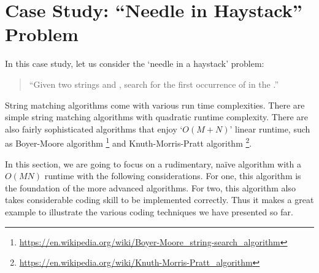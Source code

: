 %
%
%    
%    


\section{Case Study: ``Needle in Haystack'' Problem}\label{sec:nested-loop-pattern-matching}

In this case study, let us consider the `needle in a haystack' problem:
\begin{quote}
``Given two strings  and , search for the first occurrence of
 in the .''
\end{quote}
String matching algorithms come with various run time complexities.
There are simple string matching algorithms with quadratic runtime complexity.
There are also fairly sophisticated algorithms that enjoy `$O(M + N)$' linear runtime,
such as Boyer-Moore algorithm
\footnote{\url{https://en.wikipedia.org/wiki/Boyer-Moore_string-search_algorithm}} and
Knuth-Morris-Pratt algorithm
\footnote{\url{https://en.wikipedia.org/wiki/Knuth-Morris-Pratt_algorithm}}.


In this section, we are going to focus on
a rudimentary, naïve algorithm with a $O(MN)$ runtime with the following considerations.
For one, this algorithm is the foundation of the more advanced algorithms.
For two, this algorithm also takes considerable coding skill to be implemented correctly.
Thus it makes a great example to illustrate
the various coding techniques we have presented so far.


